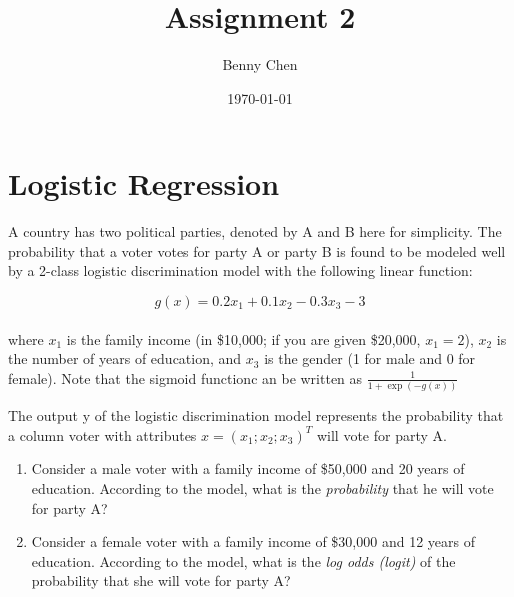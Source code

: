 \documentclass{article}
\title{Assignment 2}
\author{Benny Chen}
\date{\today}
\begin{document}
\maketitle

\section{Logistic Regression}

A country has two political parties, denoted by A and B here for simplicity. The probability that a voter votes for party A or party B is found to be modeled well by a 2-class logistic discrimination model with the following linear function:

\begin{equation}
    g(x) = 0.2x_1 + 0.1x_2 - 0.3x_3 -3
\end{equation}
\\
where $x_1$ is the family income (in \$10,000; if you are given \$20,000, $x_1 = 2$), $x_2$ is the number
of years of education, and $x_3$ is the gender (1 for male and 0 for female). Note that the sigmoid functionc an be written as $\frac{1}{1+\exp(-g(x))}$

The output y of the logistic discrimination model represents the probability that a column voter with attributes $x={(x_1; x_2; x_3)}^T$ will vote for party A.

\begin{enumerate}[label= (\alph*)]
    \item Consider a male voter with a family income of \$50,000 and 20 years of education. According to the model, what is the \emph{probability} that he will vote for party A\@?
    \item Consider a female voter with a family income of \$30,000 and 12 years of education. According to the model, what is the \emph{log odds (logit)} of the probability that she will vote for party A\@?
\end{enumerate}
\end{document}
